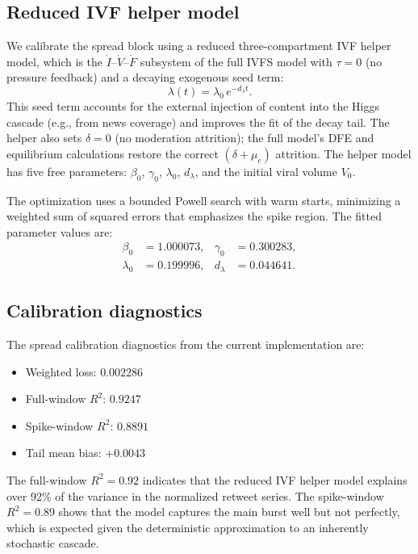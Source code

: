 \documentclass[11pt]{article}
\begin{document}
\subsection{Reduced IVF helper model}
\label{sec:helper}

We calibrate the spread block using a reduced three-compartment IVF helper model, which is the $\dot{I}$--$\dot{V}$--$\dot{F}$ subsystem of the full IVFS model with $\tau = 0$ (no pressure feedback) and a decaying exogenous seed term:
\[
\lambda(t) = \lambda_0\, e^{-d_\lambda t}.
\]
This seed term accounts for the external injection of content into the Higgs cascade (e.g., from news coverage) and improves the fit of the decay tail. The helper also sets $\delta = 0$ (no moderation attrition); the full model's DFE and equilibrium calculations restore the correct $(\delta + \mu_c)$ attrition. The helper model has five free parameters: $\beta_0$, $\gamma_0$, $\lambda_0$, $d_\lambda$, and the initial viral volume $V_0$.

The optimization uses a bounded Powell search with warm starts, minimizing a weighted sum of squared errors that emphasizes the spike region. The fitted parameter values are:
\begin{align*}
\beta_0 &= 1.000073, & \gamma_0 &= 0.300283, \\
\lambda_0 &= 0.199996, & d_\lambda &= 0.044641.
\end{align*}

\subsection{Calibration diagnostics}

The spread calibration diagnostics from the current implementation are:
\begin{itemize}[leftmargin=1.5em]
    \item Weighted loss: $0.002286$
    \item Full-window $R^2$: $0.9247$
    \item Spike-window $R^2$: $0.8891$
    \item Tail mean bias: $+0.0043$
\end{itemize}

The full-window $R^2 = 0.92$ indicates that the reduced IVF helper model explains over 92\% of the variance in the normalized retweet series. The spike-window $R^2 = 0.89$ shows that the model captures the main burst well but not perfectly, which is expected given the deterministic approximation to an inherently stochastic cascade.
\end{document}
